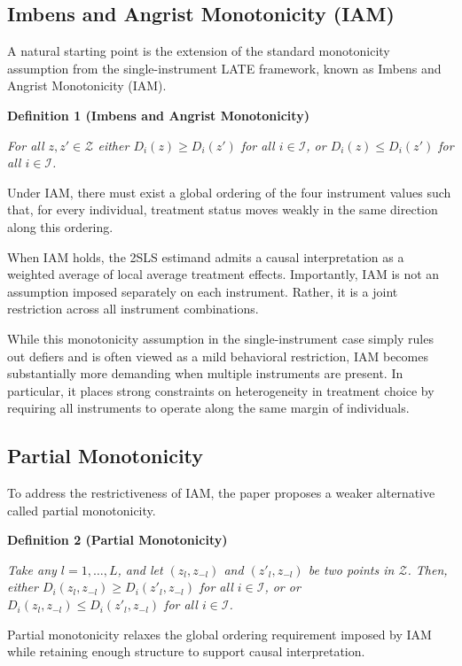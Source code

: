 \documentclass[
  12pt,
  a4paper,
  oneside]{article}
\begin{document}
\subsection{Imbens and Angrist Monotonicity
(IAM)}\label{imbens-and-angrist-monotonicity-iam}

A natural starting point is the extension of the standard monotonicity
assumption from the single-instrument LATE framework, known as Imbens
and Angrist Monotonicity (IAM).

\textbf{Definition 1 (Imbens and Angrist Monotonicity)}

\textit{For all $z, z' \in \mathcal{Z}$ either $D_i(z) \ge D_i(z')$ for all $i \in \mathcal{I}$, or $D_i(z) \le D_i(z')$ for all $i \in \mathcal{I}$.}

Under IAM, there must exist a global ordering of the four instrument
values such that, for every individual, treatment status moves weakly in
the same direction along this ordering.

When IAM holds, the 2SLS estimand admits a causal interpretation as a
weighted average of local average treatment effects. Importantly, IAM is
not an assumption imposed separately on each instrument. Rather, it is a
joint restriction across all instrument combinations.

While this monotonicity assumption in the single-instrument case simply
rules out defiers and is often viewed as a mild behavioral restriction,
IAM becomes substantially more demanding when multiple instruments are
present. In particular, it places strong constraints on heterogeneity in
treatment choice by requiring all instruments to operate along the same
margin of individuals.

\subsection{Partial Monotonicity}\label{partial-monotonicity}

To address the restrictiveness of IAM, the paper proposes a weaker
alternative called partial monotonicity.

\textbf{Definition 2 (Partial Monotonicity)}

\textit{Take any $l = 1, \dots, L$, and let $(z_l, z_{-l})$ and $(z'_l, z_{-l})$ be two points in $\mathcal{Z}$. Then, either $D_i(z_l, z_{-l}) \ge D_i(z'_l, z_{-l})$ for all $i \in \mathcal{I}$, or or $D_i(z_l, z_{-l}) \le D_i(z'_l, z_{-l})$ for all $i \in \mathcal{I}$.}

Partial monotonicity relaxes the global ordering requirement imposed by
IAM while retaining enough structure to support causal interpretation.
\end{document}
